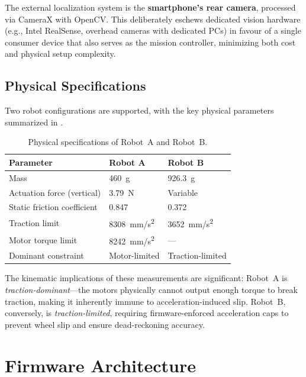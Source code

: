 \documentclass[12pt, a4paper, twoside]{article}
\begin{document}
The external localization system is the \textbf{smartphone's rear camera}, processed via CameraX with OpenCV. This deliberately eschews dedicated vision hardware (e.g., Intel RealSense, overhead cameras with dedicated PCs) in favour of a single consumer device that also serves as the mission controller, minimizing both cost and physical setup complexity.

\subsection{Physical Specifications}

Two robot configurations are supported, with the key physical parameters summarized in .

\begin{table}[H]
    \centering
    \caption{Physical specifications of Robot~A and Robot~B.}
    \label{tab:physical-specs}
    \begin{tabular}{@{}lll@{}}
        \toprule
        \textbf{Parameter} & \textbf{Robot A} & \textbf{Robot B} \\
        \midrule
        Mass                          & \SI{460}{\gram}   & \SI{926.3}{\gram}   \\
        Actuation force (vertical)     & \SI{3.79}{\newton} & Variable \\
        Static friction coefficient    & 0.847              & 0.372 \\
        Traction limit                 & \SI{8308}{mm/s^2}  & \SI{3652}{mm/s^2} \\
        Motor torque limit             & \SI{8242}{mm/s^2}  & --- \\
        Dominant constraint            & Motor-limited      & Traction-limited \\
        \bottomrule
    \end{tabular}
\end{table}

The kinematic implications of these measurements are significant: Robot~A is \emph{traction-dominant}---the motors physically cannot output enough torque to break traction, making it inherently immune to acceleration-induced slip. Robot~B, conversely, is \emph{traction-limited}, requiring firmware-enforced acceleration caps to prevent wheel slip and ensure dead-reckoning accuracy.

\section{Firmware Architecture}
\label{sec:firmware}
\end{document}
